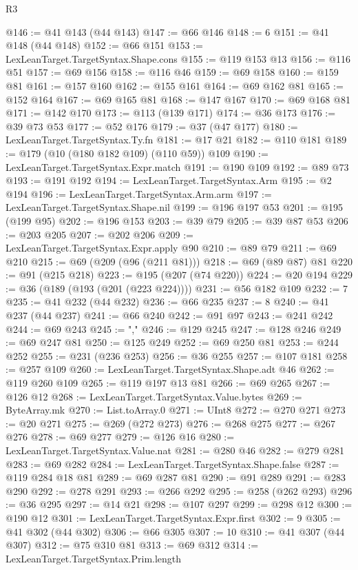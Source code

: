 \begin{lexlean}{R3}
\begin{coremodule}
@146 := @41 @143 (@44 @143)
@147 := @66 @146
@148 := 6
@151 := @41 @148 (@44 @148)
@152 := @66 @151
@153 := LexLeanTarget.TargetSyntax.Shape.cons
@155 := @119 @153 @13
@156 := @116 @51
@157 := @69 @156
@158 := @116 @46
@159 := @69 @158
@160 := @159 @81
@161 := @157 @160
@162 := @155 @161
@164 := @69 @162 @81
@165 := @152 @164
@167 := @69 @165 @81
@168 := @147 @167
@170 := @69 @168 @81
@171 := @142 @170
@173 := @113 (@139 @171)
@174 := @36 @173
@176 := @39 @73 @53
@177 := @52 @176
@179 := @37 (@47 @177)
@180 := LexLeanTarget.TargetSyntax.Ty.fn
@181 := @17 @21
@182 := @110 @181
@189 := @179 (@10 (@180 @182 @109) (@110 @59)) @109
@190 := LexLeanTarget.TargetSyntax.Expr.match
@191 := @190 @109
@192 := @89 @73
@193 := @191 @192
@194 := LexLeanTarget.TargetSyntax.Arm
@195 := @2 @194
@196 := LexLeanTarget.TargetSyntax.Arm.arm
@197 := LexLeanTarget.TargetSyntax.Shape.nil
@199 := @196 @197 @53
@201 := @195 (@199 @95)
@202 := @196 @153
@203 := @39 @79
@205 := @39 @87 @53
@206 := @203 @205
@207 := @202 @206
@209 := LexLeanTarget.TargetSyntax.Expr.apply @90
@210 := @89 @79
@211 := @69 @210
@215 := @69 (@209 (@96 (@211 @81)))
@218 := @69 (@89 @87) @81
@220 := @91 (@215 @218)
@223 := @195 (@207 (@74 @220))
@224 := @20 @194
@229 := @36 (@189 (@193 (@201 (@223 @224))))
@231 := @56 @182 @109
@232 := 7
@235 := @41 @232 (@44 @232)
@236 := @66 @235
@237 := 8
@240 := @41 @237 (@44 @237)
@241 := @66 @240
@242 := @91 @97
@243 := @241 @242
@244 := @69 @243
@245 := ","
@246 := @129 @245
@247 := @128 @246
@249 := @69 @247 @81
@250 := @125 @249
@252 := @69 @250 @81
@253 := @244 @252
@255 := @231 (@236 @253)
@256 := @36 @255
@257 := @107 @181
@258 := @257 @109
@260 := LexLeanTarget.TargetSyntax.Shape.adt @46
@262 := @119 @260 @109
@265 := @119 @197 @13 @81
@266 := @69 @265
@267 := @126 @12
@268 := LexLeanTarget.TargetSyntax.Value.bytes
@269 := ByteArray.mk
@270 := List.toArray.{0}
@271 := UInt8
@272 := @270 @271
@273 := @20 @271
@275 := @269 (@272 @273)
@276 := @268 @275
@277 := @267 @276
@278 := @69 @277
@279 := @126 @16
@280 := LexLeanTarget.TargetSyntax.Value.nat
@281 := @280 @46
@282 := @279 @281
@283 := @69 @282
@284 := LexLeanTarget.TargetSyntax.Shape.false
@287 := @119 @284 @18 @81
@289 := @69 @287 @81
@290 := @91 @289
@291 := @283 @290
@292 := @278 @291
@293 := @266 @292
@295 := @258 (@262 @293)
@296 := @36 @295
@297 := @14 @21
@298 := @107 @297
@299 := @298 @12
@300 := @190 @12
@301 := LexLeanTarget.TargetSyntax.Expr.first
@302 := 9
@305 := @41 @302 (@44 @302)
@306 := @66 @305
@307 := 10
@310 := @41 @307 (@44 @307)
@312 := @75 @310 @81
@313 := @69 @312
@314 := LexLeanTarget.TargetSyntax.Prim.length

\end{coremodule}
\end{lexlean}
